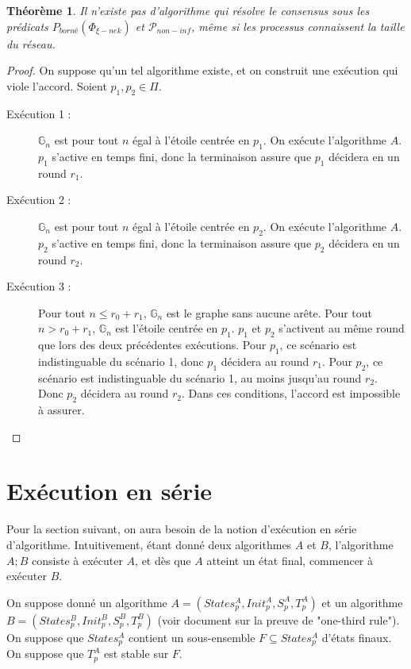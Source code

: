 \documentclass{article}
\newtheorem{theorem}{Théorème}
\begin{document}
\begin{theorem}
	Il n'existe pas d'algorithme qui résolve le consensus sous les prédicats $P_{borné}(\Phi_{\xi-nek})$ et $\mathcal{P}_{non-inf}$, même si les processus connaissent la taille du réseau.
\end{theorem}
\begin{proof}
	On suppose qu'un tel algorithme existe, et on construit une exécution qui viole l'accord.
	Soient $p_1, p_2 \in \Pi$.
	\begin{description}

		\item[Exécution 1 :] $\mathds{G}_n$ est pour tout $n$ égal à l'étoile centrée en $p_1$. On exécute l'algorithme $A$.
			$p_1$ s'active en temps fini, donc la terminaison assure que $p_1$ décidera en un round $r_1$.
		\item[Exécution 2 :] $\mathds{G}_n$ est pour tout $n$ égal à l'étoile centrée en $p_2$. On exécute l'algorithme $A$.
			$p_2$ s'active en temps fini, donc la terminaison assure que $p_2$ décidera en un round $r_2$.
		\item[Exécution 3 :] Pour tout $n \leq r_0 + r_1$, $\mathds{G}_n$ est le graphe sans aucune arête. Pour tout $n > r_0 + r_1$, $\mathds{G}_n$ est l'étoile centrée en $p_1$.
			$p_1$ et $p_2$ s'activent au même round que lors des deux précédentes exécutions.
			Pour $p_1$, ce scénario est indistinguable du scénario 1, donc $p_1$ décidera au round $r_1$.
			Pour $p_2$, ce scénario est indistinguable du scénario 1, au moins jusqu'au round $r_2$. Donc $p_2$ décidera au round $r_2$.
			Dans ces conditions, l'accord est impossible à assurer.

	\end{description}
\end{proof}

\section{Exécution en série}

Pour la section suivant, on aura besoin de la notion d'exécution en série d'algorithme.
Intuitivement, étant donné deux algorithmes $A$ et $B$, l'algorithme $A;B$ consiste à exécuter $A$, et dès que $A$ atteint un état final, commencer à exécuter $B$.

On suppose donné un algorithme $A = (States_p^A, Init_p^A, S_p^A, T_p^A)$ et un algorithme $B = (States_p^B, Init_p^B, S_p^B, T_p^B)$ (voir document sur la preuve de "one-third rule").
On suppose que $States_p^A$ contient un sous-ensemble $F \subseteq States_p^A$ d'états finaux. On suppose que $T_p^A$ est stable sur $F$.
\end{document}
